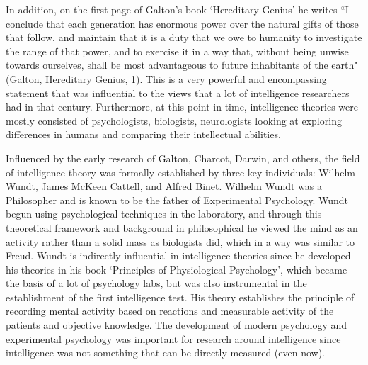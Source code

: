 \documentclass[11pt, oneside]{article}
\begin{document}
\par In addition, on the first page of Galton's book `Hereditary Genius' he writes ``I conclude that each generation has enormous power over the natural gifts of those that follow, and maintain that it is a duty that we owe to humanity to investigate the range of that power, and to exercise it in a way that, without being unwise towards ourselves, shall be most advantageous to future inhabitants of the earth" (Galton, Hereditary Genius, 1). This is a very powerful and encompassing statement that was influential to the views that a lot of intelligence researchers had in that century. Furthermore, at this point in time, intelligence theories were mostly consisted of psychologists, biologists, neurologists looking at exploring differences in humans and comparing their intellectual abilities.

\par Influenced by the early research of Galton, Charcot, Darwin, and others, the field of intelligence theory was formally established by three key individuals: Wilhelm Wundt, James McKeen Cattell, and Alfred Binet. Wilhelm Wundt was a Philosopher and is known to be the father of Experimental Psychology. Wundt begun using psychological techniques in the laboratory, and through this theoretical framework and background in philosophical he viewed the mind as an activity rather than a solid mass as biologists did, which in a way was similar to Freud. Wundt is indirectly influential in intelligence theories since he developed his theories in his book `Principles of Physiological Psychology', which became the basis of a lot of psychology labs, but was also instrumental in the establishment of the first intelligence test. His theory establishes the principle of recording mental activity based on reactions and measurable activity of the patients and objective knowledge. The development of modern psychology and experimental psychology was important for research around intelligence since intelligence was not something that can be directly measured (even now).
\end{document}
